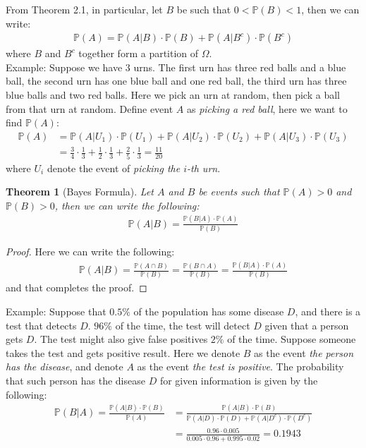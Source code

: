 \documentclass[11pt]{book}
\theoremstyle{break}
\theoremstyle{break}
\newtheorem{thm}{Theorem}[section]
\newcommand{\example}{\color{green}Example: \color{black}}
\begin{document}
From Theorem 2.1, in particular, let $B$ be such that $0 < \mathbb{P}(B) <1$, then we can write:
\begin{align*}
\mathbb{P}(A) = \mathbb{P}(A|B) \cdot \mathbb{P}(B) + \mathbb{P}(A|B^c) \cdot \mathbb{P}(B^c)
\end{align*}
where $B$ and $B^c$ together form a partition of $\Omega$. \\

\example Suppose we have $3$ urns. The first urn has three red balls and a blue ball,  the second urn has one blue ball and one red ball, the third urn has three blue balls and two red balls. Here we pick an urn at random, then pick a ball from that urn at random. Define event $A$ as \textit{picking a red ball}, here we want to find $\mathbb{P}(A)$:
\begin{align*}
\mathbb{P}(A) &= \mathbb{P}(A|U_1)\cdot \mathbb{P}(U_1) +\mathbb{P}(A|U_2)\cdot \mathbb{P}(U_2) + \mathbb{P}(A|U_3)\cdot \mathbb{P}(U_3) \\
&=\frac{3}{4}\cdot \frac{1}{3} + \frac{1}{2}\cdot \frac{1}{3} + \frac{2}{5}\cdot \frac{1}{3} = \frac{11}{20}
\end{align*}
where $U_i$ denote the event of \textit{picking the $i$-th urn}.\\

\begin{thm}[Bayes Formula]
Let $A$ and $B$ be events such that $\mathbb{P}(A) >0$ and $\mathbb{P}(B)>0$, then we can write the following:
\begin{align*}
\mathbb{P}(A|B) = \frac{\mathbb{P}(B|A)\cdot \mathbb{P}(A)}{\mathbb{P}(B)}
\end{align*} 
\end{thm}
\begin{proof}
Here we can write the following:
\begin{align*}
\mathbb{P}(A|B) = \frac{\mathbb{P}(A\cap B)}{\mathbb{P}(B)} = \frac{\mathbb{P}(B\cap A)}{\mathbb{P}(B)} = \frac{\mathbb{P}(B|A) \cdot \mathbb{P}(A)}{\mathbb{P}(B)}
\end{align*}
and that completes the proof.
\end{proof}


\example Suppose that $0.5\%$ of the population has some disease $D$, and there is a test that detects $D$. $96\%$ of the time, the test will detect $D$ given that a person gets $D$. The test might also give false positives $2\%$ of the time. Suppose someone takes the test and gets positive result. Here we denote $B$ as the event \textit{the person has the disease}, and denote $A$ as the event \textit{the test is positive}. The probability that such person has the disease $D$ for given information is given by the following:
\begin{align*}
\mathbb{P}(B|A) =  \frac{\mathbb{P}(A|B)\cdot \mathbb{P}(B)}{\mathbb{P}(A)}&=\frac{\mathbb{P}(A|B)\cdot \mathbb{P}(B)}{\mathbb{P}(A|D)\cdot\mathbb{P}(D)+\mathbb{P}(A|D^c)\cdot\mathbb{P}(D^c)} \\
&= \frac{0.96 \cdot 0.005}{0.005\cdot 0.96 + 0.995 \cdot 0.02} =0.1943 
\end{align*}
\end{document}

